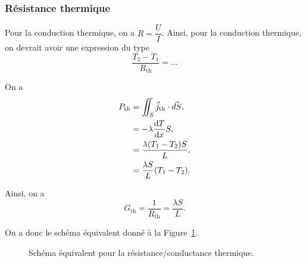         \subsubsection{Résistance thermique}

            Pour la conduction thermique, on a $R=\dfrac{U}{I}$. Ainsi, pour la conduction thermique, on devrait avoir une expression du type
            \begin{equation}
                \frac{T_2-T_1}{R_{\text{th}}}=\dots
            \end{equation}

            On a 
            \begin{align}
                P_{\text{th}}
                &=\iint_{S}\vec{j}_{\text{th}}\cdot\vec{dS},\\
                &=
                -\lambda\frac{\mathrm{d} T}{\mathrm{d} x}S,\\
                &=
                \frac{\lambda(T_1-T_2)S}{L},\\
                &=\frac{\lambda S}{L}(T_1-T_2).
            \end{align}

            Ainsi, on a 
            \begin{equation}
                \boxed{
                    G_{\text{th}}=\frac{1}{R_{\text{th}}}=\frac{\lambda S}{L}.
                }
            \end{equation}

            On a donc le schéma équivalent donné à la Figure~\ref{fig:schema_equivalent_resistance_conductance_thermique}.
            \begin{figure}
                \centering
                \caption{Schéma équivalent pour la résistance/conductance thermique.}    
                \label{fig:schema_equivalent_resistance_conductance_thermique}
            \end{figure}

